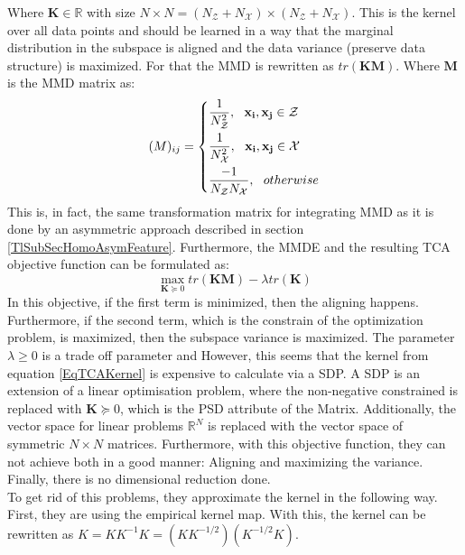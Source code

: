Where $\mathbf{K} \in \mathbb{R}$ with size $N\times N = (N_\mathcal{Z} + N_\mathcal{X}) \times (N_\mathcal{Z}+ N_\mathcal{X})$.
This is the kernel over all data points and should be learned in a way that the marginal distribution in the subspace is aligned and the data variance (preserve data structure) is maximized.
For that the \acs{MMD} is rewritten as $tr(\mathbf{KM})$.
Where $\mathbf{M}$ is the \acs{MMD} matrix as:\cite{Pan.2011}
\begin{equation}\label{EqTCAMMD}
(M)_{ij}= \begin{dcases}
\frac{1}{N_\mathcal{Z}^2},\>\>\> \mathbf{x_i},\mathbf{x_j} \in \mathcal{Z}\\
\frac{1}{N_\mathcal{X}^2},\>\>\> \mathbf{x_i},\mathbf{x_j} \in \mathcal{X}\\
\frac{-1}{N_\mathcal{Z}N_\mathcal{X}},\>\>\> otherwise
\end{dcases}
\end{equation}
This is, in fact, the same transformation matrix for integrating \acs{MMD} as it is done by an asymmetric approach described in section \ref{TlSubSecHomoAsymFeature}.
Furthermore, the \acs{MMDE} and the resulting \acs{TCA} objective function can be formulated as:\cite{Pan.2011}
\begin{equation}\label{EqTCAMMDEObjt}
	\max_{\mathbf{K}\succeq 0} tr(\mathbf{KM}) - \lambda tr(\mathbf{K})
\end{equation}
In this objective, if the first term is minimized, then the aligning happens.
Furthermore, if the second term, which is the constrain of the optimization problem, is maximized, then the subspace variance is maximized.
The parameter $\lambda \ge 0$ is a trade off parameter and 
However, this seems that the kernel from equation \eqref{EqTCAKernel} is expensive to calculate via a \ac{SDP}.
A \acs{SDP} is an extension of a linear optimisation problem, where the non-negative constrained is replaced with $\mathbf{K}\succeq 0$, which is the \acs{PSD} attribute of the Matrix. Additionally, the vector space for linear problems $\mathbb{R}^N$ is replaced with the vector space of symmetric $N\times N$ matrices.\cite{Gartner.2012}
Furthermore, with this objective function, they can not achieve both in a good manner:
Aligning and maximizing the variance.
Finally, there is no dimensional reduction done.\cite{Pan.2011}\\
To get rid of this problems, they approximate the kernel in the following way.
First, they are using the empirical kernel map.
With this, the kernel can be rewritten as $K = KK^{-1}K = (KK^{-1/2})(K^{-1/2}K)$.\cite{Pan.2011}
